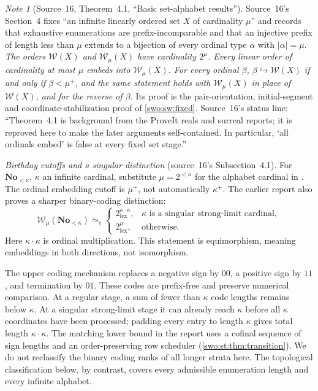 \documentclass[11pt]{article}
\theoremstyle{definition}
\theoremstyle{remark}
\newtheorem{note}[note]{Note}
\newcommand{\No}{\mathbf{No}}
\newcommand{\WO}{\mathcal W}
\newcommand{\lex}{\mathrm{lex}}
\newcommand{\emb}{\hookrightarrow}
\newcommand{\equi}{\mathrel{\simeq_{\!e}}}
\newcommand{\card}[1]{\lvert #1\rvert}
\begin{document}
\begin{note}[Source~16, Theorem~4.1, ``Basic set-alphabet results'']\label{swo:ds:thm:setspectrum}\label{swo:ds:sec:setbaseline}
Source~16's Section~4 fixes ``an infinite linearly ordered set $X$ of
cardinality $\mu$'' and records that exhaustive enumerations are
prefix-incomparable and that an injective prefix of length less than $\mu$
extends to a bijection of every ordinal type $\alpha$ with $\card\alpha=\mu$.
\emph{The orders $\WO(X)$ and $\WO_\mu(X)$ have cardinality $2^\mu$. Every
linear order of cardinality at most $\mu$ embeds into $\WO_\mu(X)$. For every
ordinal $\beta$, $\beta\emb\WO(X)$ if and only if $\beta<\mu^+$, and the same
statement holds with $\WO_\mu(X)$ in place of $\WO(X)$, and for the reverse of
$\beta$.} Its proof is the pair-orientation, initial-segment and
coordinate-stabilization proof of \cref{swo:sw:fixed}. Source~16's status line:
``Theorem~4.1 is background from the ProveIt reals and surreal reports; it is
reproved here to make the later arguments self-contained. In particular,
`all ordinals embed' is false at every fixed set stage.''

\emph{Birthday cutoffs and a singular distinction} (source~16's
Subsection~4.1).
For $\No_{<\kappa}$, $\kappa$ an infinite cardinal, substitute
$\mu=2^{<\kappa}$ for the alphabet cardinal in
. The ordinal embedding cutoff is $\mu^+$,
not automatically $\kappa^+$. The earlier report also proves a sharper
binary-coding distinction:
\[
 \WO_\mu(\No_{<\kappa})\equi
 \begin{cases}
 2^{\kappa\cdot\kappa}_{\lex},
      &\kappa\text{ is a singular strong-limit cardinal},\\
 2^\mu_{\lex},&\text{otherwise}.
 \end{cases}
\tag{S16.2}\label{swo:ds:eq:singular}
\]
Here $\kappa\cdot\kappa$ is ordinal multiplication. This statement is
equimorphism, meaning embeddings in both directions, not isomorphism.

The upper coding mechanism replaces a negative sign by $00$, a positive
sign by $11$, and termination by $01$. These codes are prefix-free and
preserve numerical comparison. At a regular stage, a sum of fewer than
$\kappa$ code lengths remains below $\kappa$. At a singular strong-limit
stage it can already reach $\kappa$ before all $\kappa$ coordinates have
been processed; padding every entry to length $\kappa$ gives total length
$\kappa\cdot\kappa$. The matching lower bound in the report uses a
cofinal sequence of sign lengths and an order-preserving row scheduler
(\cref{swo:st:thm:transition}).
We do not reclassify the binary coding ranks of all longer strata here.
The topological classification below, by contrast, covers every admissible
enumeration length and every infinite alphabet.
\end{note}
\end{document}
